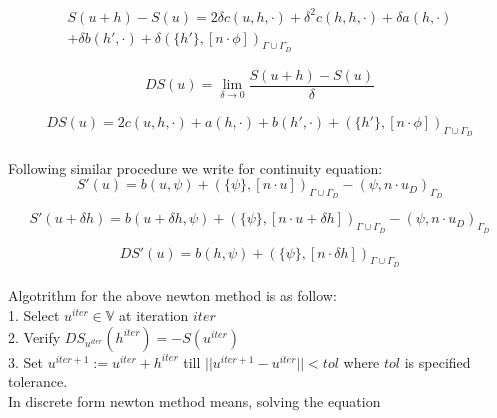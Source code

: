 \documentclass[a4paper,12pt]{book}
\begin{document}
\begin{equation}
\begin{split}
S(u+h) - S(u) = 2\delta c(u,h,\cdot) + \delta^2 c(h,h,\cdot) + \delta a(h,\cdot)\\ + \delta b(h',\cdot) + \delta (\{h'\},[n\cdot \phi])_{\Gamma \cup \Gamma_D}
\end{split}
\end{equation}


\begin{equation}
DS(u) = \lim_{\delta \to 0} \frac{S(u+h)-S(u)}{\delta}
\end{equation}

\begin{equation}
\begin{split}
DS(u) = 2 c(u,h,\cdot) + a(h,\cdot) + b(h',\cdot) + (\{h'\},[n\cdot \phi])_{\Gamma \cup \Gamma_D}
\end{split}
\end{equation}\\

Following similar procedure we write for continuity equation:\\
\begin{equation}
S'(u) = b(u,\psi) + (\{\psi\},[n \cdot u])_{\Gamma \cup \Gamma_D} - (\psi,n \cdot u_D)_{\Gamma_D}
\end{equation}

\begin{equation}
S'(u+\delta h) = b(u + \delta h,\psi) + (\{\psi\},[n \cdot u + \delta h])_{\Gamma \cup \Gamma_D} - (\psi,n \cdot u_D)_{\Gamma_D}
\end{equation}

\begin{equation}
DS'(u) = b(h,\psi) + (\{\psi\},[n \cdot \delta h])_{\Gamma \cup \Gamma_D} 
\end{equation}
\\
Algotrithm for the above newton method is as follow:\\

1. Select $u^{iter} \in \mathbb{V}$ at iteration $iter$\\

2. Verify $DS_{u^{iter}}(h^{iter}) = -S(u^{iter})$\\

3. Set $u^{iter + 1} := u^{iter} + h^{iter}$ till $||u^{iter+1} - u^{iter}|| < tol$ where $tol$ is specified tolerance.\\

In discrete form newton method means, solving the equation
\end{document}
